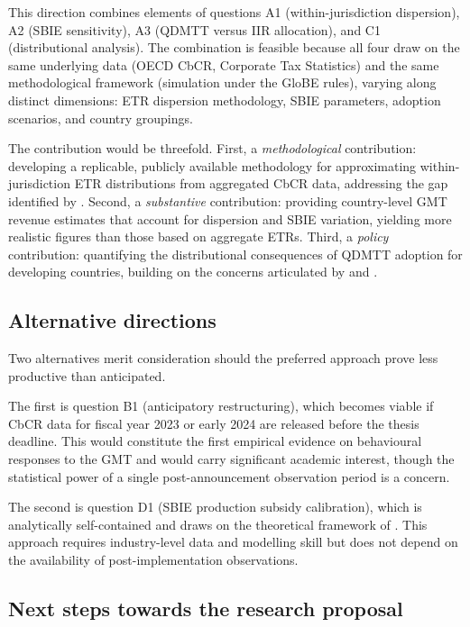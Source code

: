 \documentclass[12pt,a4paper]{article}
\begin{document}
This direction combines elements of questions A1 (within-jurisdiction dispersion), A2 (SBIE sensitivity), A3 (QDMTT versus IIR allocation), and C1 (distributional analysis).
The combination is feasible because all four draw on the same underlying data (OECD CbCR, Corporate Tax Statistics) and the same methodological framework (simulation under the GloBE rules), varying along distinct dimensions: ETR dispersion methodology, SBIE parameters, adoption scenarios, and country groupings.

The contribution would be threefold.
First, a \emph{methodological} contribution: developing a replicable, publicly available methodology for approximating within-jurisdiction ETR distributions from aggregated CbCR data, addressing the gap identified by \textcite{hugger2025}.
Second, a \emph{substantive} contribution: providing country-level GMT revenue estimates that account for dispersion and SBIE variation, yielding more realistic figures than those based on aggregate ETRs.
Third, a \emph{policy} contribution: quantifying the distributional consequences of QDMTT adoption for developing countries, building on the concerns articulated by \textcite{vantriet2025} and \textcite{liotti2022}.

\subsection{Alternative directions}

Two alternatives merit consideration should the preferred approach prove less productive than anticipated.

The first is question B1 (anticipatory restructuring), which becomes viable if CbCR data for fiscal year 2023 or early 2024 are released before the thesis deadline.
This would constitute the first empirical evidence on behavioural responses to the GMT and would carry significant academic interest, though the statistical power of a single post-announcement observation period is a concern.

The second is question D1 (SBIE production subsidy calibration), which is analytically self-contained and draws on the theoretical framework of \textcite{schjelderup2024}.
This approach requires industry-level data and modelling skill but does not depend on the availability of post-implementation observations.

\subsection{Next steps towards the research proposal}
\end{document}
